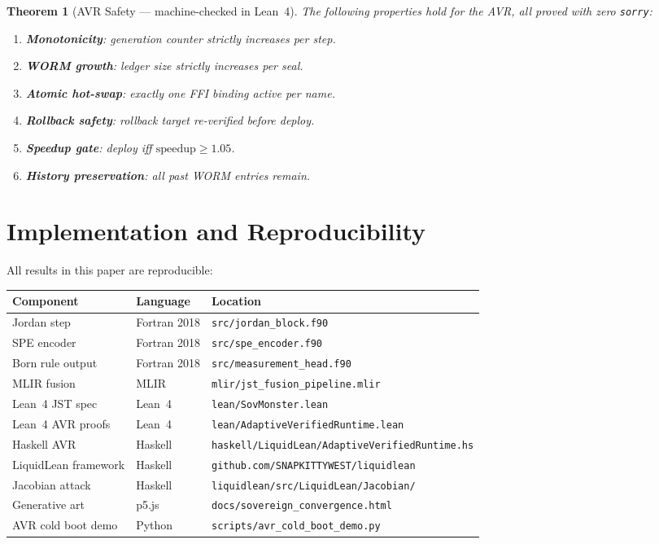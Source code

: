 \documentclass[12pt, letterpaper]{article}
\theoremstyle{plain}
\newtheorem{theorem}{Theorem}[section]
\theoremstyle{definition}
\theoremstyle{remark}
\begin{document}
\begin{theorem}[AVR Safety --- machine-checked in Lean~4]
\label{thm:avr_safety}
The following properties hold for the AVR, all proved with zero \texttt{sorry}:
\begin{enumerate}[nosep]
  \item \textbf{Monotonicity}: generation counter strictly increases per step.
  \item \textbf{WORM growth}: ledger size strictly increases per seal.
  \item \textbf{Atomic hot-swap}: exactly one FFI binding active per name.
  \item \textbf{Rollback safety}: rollback target re-verified before deploy.
  \item \textbf{Speedup gate}: deploy iff $\text{speedup} \geq 1.05$.
  \item \textbf{History preservation}: all past WORM entries remain.
\end{enumerate}
\end{theorem}

\section{Implementation and Reproducibility}

All results in this paper are reproducible:

\begin{center}
\begin{tabular}{@{}lll@{}}
\toprule
\textbf{Component} & \textbf{Language} & \textbf{Location} \\
\midrule
Jordan step & Fortran 2018 & \texttt{src/jordan\_block.f90} \\
SPE encoder & Fortran 2018 & \texttt{src/spe\_encoder.f90} \\
Born rule output & Fortran 2018 & \texttt{src/measurement\_head.f90} \\
MLIR fusion & MLIR & \texttt{mlir/jst\_fusion\_pipeline.mlir} \\
Lean~4 JST spec & Lean~4 & \texttt{lean/SovMonster.lean} \\
Lean~4 AVR proofs & Lean~4 & \texttt{lean/AdaptiveVerifiedRuntime.lean} \\
Haskell AVR & Haskell & \texttt{haskell/LiquidLean/AdaptiveVerifiedRuntime.hs} \\
LiquidLean framework & Haskell & \texttt{github.com/SNAPKITTYWEST/liquidlean} \\
Jacobian attack & Haskell & \texttt{liquidlean/src/LiquidLean/Jacobian/} \\
Generative art & p5.js & \texttt{docs/sovereign\_convergence.html} \\
AVR cold boot demo & Python & \texttt{scripts/avr\_cold\_boot\_demo.py} \\
\bottomrule
\end{tabular}
\end{center}
\end{document}
